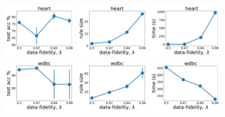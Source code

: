 \begin{figure}
	\centering
	
	\subfloat
	{\includegraphics[width=0.27\textwidth]{figures/interpretability/relaxed-cnf/heart_test_accuracy_vary_lambda.pdf}}
	\subfloat
	{\includegraphics[width=0.27\textwidth]{figures/interpretability/relaxed-cnf/heart_rule_size_vary_lambda.pdf}}
	\subfloat
	{\includegraphics[width=0.27\textwidth]{figures/interpretability/relaxed-cnf/heart_time_vary_lambda.pdf}} 
	\\

	\subfloat
	{\includegraphics[width=0.27\textwidth]{figures/interpretability/relaxed-cnf/wdbc_test_accuracy_vary_lambda.pdf}}
	\subfloat
	{\includegraphics[width=0.27\textwidth]{figures/interpretability/relaxed-cnf/wdbc_rule_size_vary_lambda.pdf}}
	\subfloat
	{\includegraphics[width=0.27\textwidth]{figures/interpretability/relaxed-cnf/wdbc_time_vary_lambda.pdf}} 
	\\
	

\end{figure}
